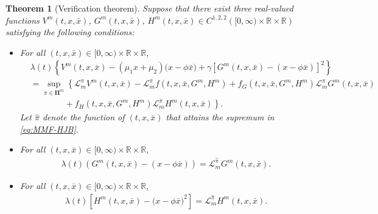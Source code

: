 \documentclass[11pt]{article}
\newtheorem{theorem}{Theorem}[section]
\numberwithin{equation}{section}
\begin{document}
	\begin{theorem}[Verification theorem]\label{th:Mverification}
		Suppose that there exist three real-valued functions $V^{\scriptscriptstyle m}(t,x,\bar{x})$, $G^{\scriptscriptstyle m}(t,x,\bar{x})$, $H^{\scriptscriptstyle m}(t,x,\bar{x})\in C^{1,2,2}({[0,\infty)}\times\mathbb{R}\times\mathbb{R})$ satisfying the following conditions:
		\begin{itemize}
			\item[$(1)$] For all \( (t,x,\bar{x})\in {[0,\infty)}\times \mathbb{R}\times \mathbb{R}\),
			\begin{align}				
				&\lambda(t)\left\{V^{\scriptscriptstyle m}(t,x,\bar{x})-(\mu_{1}x+\mu_{2})\big(x-\phi\bar{x}\big)+\gamma \left[G^{\scriptscriptstyle m}(t,x,\bar{x})-(x-\phi\bar{x})\right]^2\right\}\\	&=\sup_{{\pi}\in\boldsymbol{\Pi}^{\scriptscriptstyle m}}\left\{\mathcal{L}^{{\pi}}_{\scriptscriptstyle m}V^{\scriptscriptstyle m}(t,x,\bar{x})-\mathcal{L}^{{\pi}}_{\scriptscriptstyle m}f(t,x,\bar{x},G^{\scriptscriptstyle m},H^{\scriptscriptstyle m})+f_G(t,x,\bar{x},G^{\scriptscriptstyle m},H^{\scriptscriptstyle m})\mathcal{L}^{{\pi}}_{\scriptscriptstyle m} G^{\scriptscriptstyle m}(t,x,\bar{x})\right.\\
				&\left.\quad\quad\quad\quad+f_H(t,x,\bar{x},G^{\scriptscriptstyle m},H^{\scriptscriptstyle m})\mathcal{L}^{{\pi}}_{\scriptscriptstyle m}H^{\scriptscriptstyle m}(t,x,\bar{x})\right\}. \label{eq:MMF-HJB}
			\end{align}
			Let $\widehat{\pi}$ denote the function of $(t, x, \bar{x})$ that attains the supremum in \eqref{eq:MMF-HJB}.		
			\item[$(2)$] For all \( (t,x,\bar{x})\in {[0,\infty)}\times \mathbb{R}\times \mathbb{R}\),
			\begin{align}\label{eq:M-LG}
				\lambda(t)\left( G^{\scriptscriptstyle m}(t,x,\bar{x})-(x-\phi \bar{x})\right)=\mathcal{L}^{\widehat{{\pi}}}_{\scriptscriptstyle m}G^{\scriptscriptstyle m}(t,x,\bar{x}).
			\end{align}
			
			\item[$(3)$] For all \( (t,x,\bar{x})\in {[0,\infty)}\times \mathbb{R}\times \mathbb{R}\),
			\begin{align}\label{eq:M-LH}
				\lambda(t)\left[H^{\scriptscriptstyle m}(t,x,\bar{x})-\big(x-\phi \bar{x}\big)^2\right]=\mathcal{L}_{\scriptscriptstyle m}^{{\widehat{\pi}}}H^{\scriptscriptstyle m}(t,x,\bar{x}).
			\end{align}
			

\end{itemize}
\end{theorem}
\end{document}
